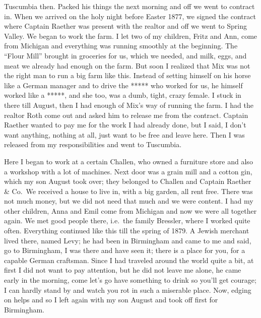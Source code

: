 \documentclass{article}
\begin{document}
Tuscumbia then. Packed his things the next morning and off we went to contract in. When we arrived on the holy night before Easter 1877, we signed the contract where Captain Raether was present with the realtor and off we went to Spring Valley. We began to work the farm. I let two of my children, Fritz and Ann, come from Michigan and everything was running smoothly at the beginning. The ``Flour Mill'' brought in groceries for us, which we needed, and milk, eggs, and meat we already had enough on the farm. But soon I realized that Mix was not the right man to run a big farm like this. Instead of setting himself on his horse like a German manager and to drive the ***** who worked for us, he himself worked like a *****, and she too, was a dumb, tight, crazy female. I stuck in there till August, then I had enough of Mix's way of running the farm. I had the realtor Roth come out and asked him to release me from the contract. Captain Raether wanted to pay me for the work I had already done, but I said, I don't want anything, nothing at all, just want to be free and leave here. Then I was released from my responsibilities and went to Tuscumbia.

Here I began to work at a certain Challen, who owned a furniture store and also a workshop with a lot of machines. Next door was a grain mill and a cotton gin, which my son August took over; they belonged to Challen and Captain Raether \& Co.~We received a house to live in, with a big garden, all rent free. There was not much money, but we did not need that much and we were content. I had my other children, Anna and Emil come from Michigan and now we were all together again. We met good people there, i.e.~the family Bressler, where I worked quite often. Everything continued like this till the spring of 1879. A Jewish merchant lived there, named Levy; he had been in Birmingham and came to me and said, go to Birmingham, I was there and have seen it; there is a place for you, for a capable German craftsman. Since I had traveled around the world quite a bit, at first I did not want to pay attention, but he did not leave me alone, he came early in the morning, come let's go have something to drink so you'll get courage; I can hardly stand by and watch you rot in such a miserable place. Now, edging on helps and so I left again with my son August and took off first for Birmingham.
\end{document}
